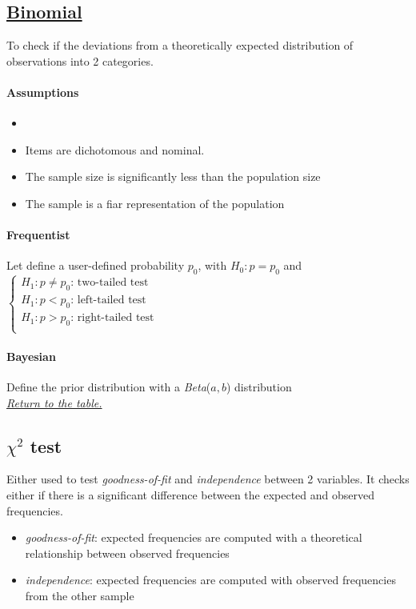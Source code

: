 \subsection{\hyperref[binomial_test]{Binomial}}
To check if the deviations from a theoretically expected distribution of observations into
2 categories.\\

\paragraph{Assumptions}
\begin{itemize}
    \item {}
    \item Items are dichotomous and nominal.
    \item The sample size is significantly less than the population size
    \item The sample is a fiar representation of the population
\end{itemize}


\paragraph{Frequentist}
Let define a user-defined probability $p_{0}$, with $H_{0}: p = p_{0}$ and
$\begin{cases}
    H_{1}: p \neq p_{0}\text{: two-tailed test} \\
    H_{1}: p < p_{0}\text{: left-tailed test} \\
    H_{1}: p > p_{0}\text{: right-tailed test} \\
     
\end{cases}$

\paragraph{Bayesian}
Define the prior distribution with a \emph{Beta}($a,b$) distribution\\

\textit{\hyperref[statistical_method_table]{Return to the table.}}


\subsection{$\chi^{2}$ test}
Either used to test \emph{goodness-of-fit} and \emph{independence} between 2 variables.
It checks either if there is a significant difference between the expected and observed 
frequencies.
\begin{itemize}
    \item \emph{goodness-of-fit}: expected frequencies are computed with a theoretical 
        relationship between observed frequencies
    \item \emph{independence}: expected frequencies are computed with observed frequencies
        from the other sample
\end{itemize}

